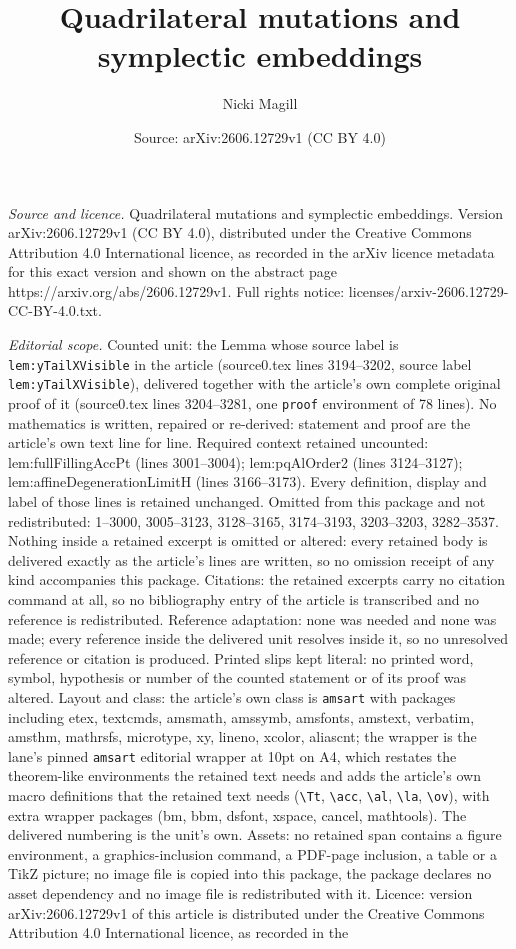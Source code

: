 \documentclass[10pt,a4paper]{amsart}
\title[Quadrilateral mutations and symplectic embeddings]{Quadrilateral mutations and symplectic embeddings}
\author{Nicki Magill}
\date{Source: arXiv:2606.12729v1 (CC BY 4.0)}
\begin{document}
\maketitle

\noindent\emph{Source and licence.} Quadrilateral mutations and symplectic embeddings. Version arXiv:2606.12729v1 (CC BY 4.0), distributed under the Creative Commons Attribution 4.0 International licence, as recorded in the arXiv licence metadata for this exact version and shown on the abstract page https://arxiv.org/abs/2606.12729v1. Full rights notice: licenses/arxiv-2606.12729-CC-BY-4.0.txt.\par\smallskip

\noindent\textit{Editorial scope.} Counted unit: the Lemma whose source label is \texttt{lem:yTailXVisible} in the article (source0.tex lines 3194--3202, source label \texttt{lem:yTailXVisible}), delivered together with the article's own complete original proof of it (source0.tex lines 3204--3281, one \texttt{proof} environment of 78 lines). No mathematics is written, repaired or re-derived: statement and proof are the article's own text line for line. Required context retained uncounted: lem:fullFillingAccPt (lines 3001--3004); lem:pqAlOrder2 (lines 3124--3127); lem:affineDegenerationLimitH (lines 3166--3173). Every definition, display and label of those lines is retained unchanged. Omitted from this package and not redistributed: 1--3000, 3005--3123, 3128--3165, 3174--3193, 3203--3203, 3282--3537. Nothing inside a retained excerpt is omitted or altered: every retained body is delivered exactly as the article's lines are written, so no omission receipt of any kind accompanies this package. Citations: the retained excerpts carry no citation command at all, so no bibliography entry of the article is transcribed and no reference is redistributed. Reference adaptation: none was needed and none was made; every reference inside the delivered unit resolves inside it, so no unresolved reference or citation is produced. Printed slips kept literal: no printed word, symbol, hypothesis or number of the counted statement or of its proof was altered. Layout and class: the article's own class is \texttt{amsart} with packages including etex, textcmds, amsmath, amssymb, amsfonts, amstext, verbatim, amsthm, mathrsfs, microtype, xy, lineno, xcolor, aliascnt; the wrapper is the lane's pinned \texttt{amsart} editorial wrapper at 10pt on A4, which restates the theorem-like environments the retained text needs and adds the article's own macro definitions that the retained text needs (\texttt{\textbackslash Tt}, \texttt{\textbackslash acc}, \texttt{\textbackslash al}, \texttt{\textbackslash la}, \texttt{\textbackslash ov}), with extra wrapper packages (bm, bbm, dsfont, xspace, cancel, mathtools). The delivered numbering is the unit's own. Assets: no retained span contains a figure environment, a graphics-inclusion command, a PDF-page inclusion, a table or a TikZ picture; no image file is copied into this package, the package declares no asset dependency and no image file is redistributed with it. Licence: version arXiv:2606.12729v1 of this article is distributed under the Creative Commons Attribution 4.0 International licence, as recorded in the 
\end{document}
